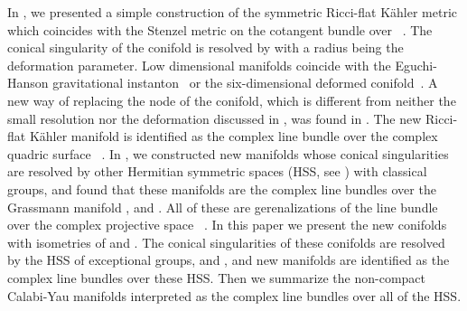 \documentclass[a4paper,11pt]{article}
\providecommand{\kahler}{K\"{a}hler }
\begin{document}
{In \cite{HKN1},
we presented a simple construction 
of the \coordHE{} symmetric Ricci-flat \kahler metric 
which coincides with the Stenzel metric 
on the cotangent bundle over \coordHE{}~\cite{St,CGLP}.
The conical singularity of the conifold is resolved 
by \coordHE{} with a radius being the deformation parameter.
Low dimensional manifolds coincide with 
the Eguchi-Hanson gravitational instanton~\cite{EH}  
or the six-dimensional deformed conifold~\cite{conifold,conifold2}.
A new way of replacing the node of the conifold, 
which is 
different from neither the small resolution 
nor the deformation discussed in 
\cite{conifold,conifold2}, 
was found in \cite{PT,HKN2}.
The new Ricci-flat \kahler manifold is identified 
as the complex line bundle over 
the complex quadric surface 
\coordHE{}~\cite{HKN2}. 
In \cite{HKN3},
we constructed new manifolds 
whose conical singularities are resolved 
by other Hermitian symmetric spaces (HSS, see \cite{HN1,HN2})
with classical groups, and found that 
these manifolds are the complex line bundles over 
the Grassmann manifold 
\coordHE{}, 
\coordHE{} and \coordHE{}. 
All of these are gerenalizations of 
the line bundle over 
the complex projective space \coordHE{}~\cite{Ca}. 
In this paper
we present the new conifolds with isometries of 
\coordHE{} and \coordHE{}.   
The conical singularities of these conifolds 
are resolved by the HSS of exceptional groups,  
\coordHE{} and
\coordHE{}, 
and new manifolds are identified 
as the complex line bundles over 
these HSS.
Then we summarize the non-compact Calabi-Yau manifolds
interpreted as the complex line bundles over all of the HSS.


}
\end{document}
